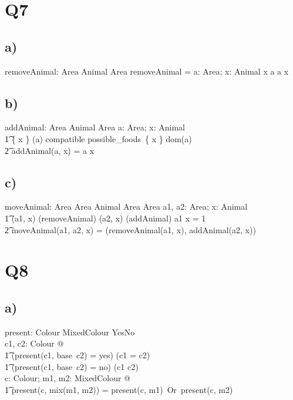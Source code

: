 \documentclass{article}
\begin{document}
\section*{Q7}

\subsection*{\small a)}
\begin{axdef} 
	removeAnimal: Area \cross Animal \pfun Area
\where
	removeAnimal = \lambda a: Area; x: Animal \mid x \inbag a \spot a \uminus \lbag x \rbag \\
\end{axdef}

\subsection*{\small b)}
\begin{axdef} 
	addAnimal: Area \cross Animal \pfun Area
\where
	\forall a: Area; x: Animal \mid \\
		\t1 \{ x \} \cross \dom(a) \subseteq compatible \land \bigcap possible\_foods\ \limg \{ x \} \cup dom(a) \rimg \neq \emptyset \spot  \\
		\t2 addAnimal(a, x) = a \uplus \lbag x \rbag
\end{axdef}
	
\subsection*{\small c)}
\begin{axdef} %
	moveAnimal: Area \cross Area \cross Animal \pfun Area \cross Area
\where
\forall a1, a2: Area; x: Animal \mid \\ 
	\t1 (a1, x) \in \dom(removeAnimal) \land (a2, x) \in \dom(addAnimal) \land a1 \bcount x = 1 \spot \\
	\t2 moveAnimal(a1, a2, x) = (removeAnimal(a1, x), addAnimal(a2, x))
\end{axdef}

\section*{Q8}

\subsection*{\small a)}
\begin{axdef}
	present: Colour \cross MixedColour \fun YesNo \\
\where
\forall c1, c2: Colour @ \\
	\t1 (present(c1, base\ c2) = yes) \iff (c1 = c2) \\
	\t1 (present(c1, base\ c2) = no) \iff (c1 \neq c2) \\
\forall c: Colour; m1, m2: MixedColour @ \\
	\t1 present(c, mix(m1, m2)) = present(c, m1)\ Or\ present(c, m2) \\
\end{axdef}
\end{document}
